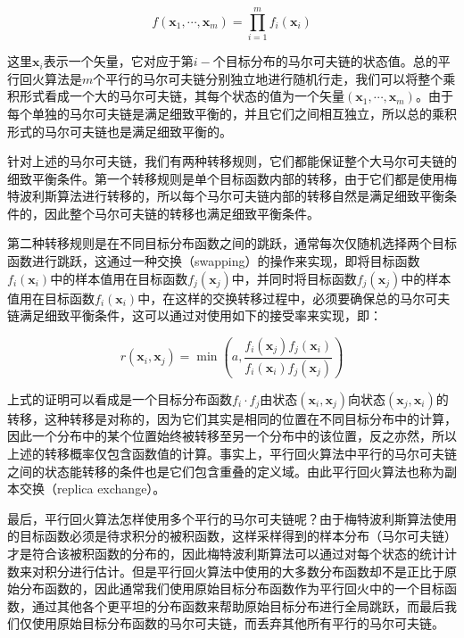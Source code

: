 \begin{equation}
	f(\mathbf{x}_1,\cdots,\mathbf{x}_m)=\prod^{m}_{i=1}f_i(\mathbf{x}_i)
\end{equation}

\noindent 这里$\mathbf{x}_i$表示一个矢量，它对应于第$i-$个目标分布的马尔可夫链的状态值。总的平行回火算法是$m$个平行的马尔可夫链分别独立地进行随机行走，我们可以将整个乘积形式看成一个大的马尔可夫链，其每个状态的值为一个矢量$(\mathbf{x}_1,\cdots,\mathbf{x}_m)$。由于每个单独的马尔可夫链是满足细致平衡的，并且它们之间相互独立，所以总的乘积形式的马尔可夫链也是满足细致平衡的。

针对上述的马尔可夫链，我们有两种转移规则，它们都能保证整个大马尔可夫链的细致平衡条件。第一个转移规则是单个目标函数内部的转移，由于它们都是使用梅特波利斯算法进行转移的，所以每个马尔可夫链内部的转移自然是满足细致平衡条件的，因此整个马尔可夫链的转移也满足细致平衡条件。

第二种转移规则是在不同目标分布函数之间的跳跃，通常每次仅随机选择两个目标函数进行跳跃，这通过一种交换（swapping）的操作来实现，即将目标函数$f_i(\mathbf{x}_i)$中的样本值用在目标函数$f_j(\mathbf{x}_j)$中，并同时将目标函数$f_j(\mathbf{x}_j)$中的样本值用在目标函数$f_i(\mathbf{x}_i)$中，在这样的交换转移过程中，必须要确保总的马尔可夫链满足细致平衡条件，这可以通过对使用如下的接受率来实现，即：

\begin{equation}
	r(\mathbf{x}_i,\mathbf{x}_j)=\min(a,\frac{f_i(\mathbf{x}_j)f_j(\mathbf{x}_i)}{f_i(\mathbf{x}_i)f_j(\mathbf{x}_j)})
\end{equation}

\noindent 上式的证明可以看成是一个目标分布函数$f_i\cdot f_j$由状态$(\mathbf{x}_i,\mathbf{x}_j)$向状态$(\mathbf{x}_j,\mathbf{x}_i)$的转移，这种转移是对称的，因为它们其实是相同的位置在不同目标分布中的计算，因此一个分布中的某个位置始终被转移至另一个分布中的该位置，反之亦然，所以上述的转移概率仅包含函数值的计算。事实上，平行回火算法中平行的马尔可夫链之间的状态能转移的条件也是它们包含重叠的定义域。由此平行回火算法也称为副本交换（replica exchange）。

最后，平行回火算法怎样使用多个平行的马尔可夫链呢？由于梅特波利斯算法使用的目标函数必须是待求积分的被积函数，这样采样得到的样本分布（马尔可夫链）才是符合该被积函数的分布的，因此梅特波利斯算法可以通过对每个状态的统计计数来对积分进行估计。但是平行回火算法中使用的大多数分布函数却不是正比于原始分布函数的，因此通常我们使用原始目标分布函数作为平行回火中的一个目标函数，通过其他各个更平坦的分布函数来帮助原始目标分布进行全局跳跃，而最后我们仅使用原始目标分布函数的马尔可夫链，而丢弃其他所有平行的马尔可夫链。

